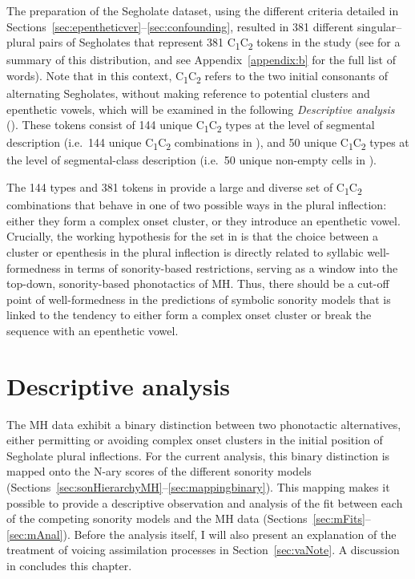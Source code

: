 The preparation of the Segholate dataset, using the different criteria detailed in Sections~\ref{sec:epentheticver}--\ref{sec:confounding}, resulted in 381 different singular--plural pairs of Segholates that represent 381 C\textsubscript{1}C\textsubscript{2} tokens in the study (see  for a summary of this distribution, and see Appendix~\ref{appendix:b} for the full list of words). Note that in this context, C\textsubscript{1}C\textsubscript{2} refers to the two initial consonants of alternating Segholates, without making reference to potential clusters and epenthetic vowels, which will be examined in the following \textit{Descriptive analysis} (). These tokens consist of 144 unique C\textsubscript{1}C\textsubscript{2} types at the level of segmental description (i.e.~144 unique C\textsubscript{1}C\textsubscript{2} combinations in ), and 50 unique C\textsubscript{1}C\textsubscript{2} types at the level of segmental-class description (i.e.~50 unique non-empty cells in ).

The 144 types and 381 tokens in  provide a large and diverse set of C\textsubscript{1}C\textsubscript{2} combinations that behave in one of two possible ways in the plural inflection: either they form a complex onset cluster, or they introduce an epenthetic vowel. Crucially, the working hypothesis for the set in  is that the choice between a cluster or epenthesis in the plural inflection is directly related to syllabic well-formedness in terms of sonority-based restrictions, serving as a window into the top-down, sonority-based phonotactics of MH. Thus, there should be a cut-off point of well-formedness in the predictions of symbolic sonority models that is linked to the tendency to either form a complex onset cluster or break the sequence with an epenthetic vowel.

\section{Descriptive analysis}\label{sec:descriptive}

The MH data exhibit a binary distinction between two phonotactic alternatives, either permitting or avoiding complex onset clusters in the initial position of Segholate plural inflections. For the current analysis, this binary distinction is mapped onto the N-ary scores of the different sonority models (Sections~\ref{sec:sonHierarchyMH}--\ref{sec:mappingbinary}). This mapping makes it possible to provide a descriptive observation and analysis of the fit between each of the competing sonority models and the MH data (Sections~\ref{sec:mFits}--\ref{sec:mAnal}).
Before the analysis itself, I will also present an explanation of the treatment of voicing assimilation processes in Section~\ref{sec:vaNote}.
A discussion in  concludes this chapter.


